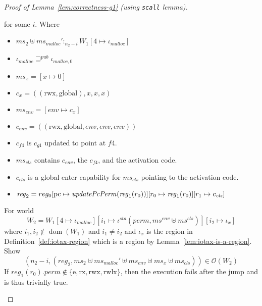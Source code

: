 \documentclass[a4paper]{article}
\newcommand{\update}[2]{[#1 \mapsto #2]}
\DeclareMathOperator{\dom}{dom}
\newcommand{\var}[1]{\mathit{#1}}
\newcommand{\hs}{\var{ms}}
\newcommand{\ms}{\hs}
\newcommand{\pcreg}{\mathrm{pc}}
\newcommand{\reg}{\var{reg}}
\newcommand{\heap}{\var{mem}}
\newcommand{\perm}{\var{perm}}
\newcommand{\sta}{\var{sta}}
\newcommand{\env}{\var{env}}
\newcommand{\cls}{\var{cls}}
\newcommand{\plainfun}[2]{
  \ifthenelse{\equal{#2}{}}
  {\mathit{#1}}
  {\mathit{#1}(#2)}
}
\newcommand{\updatePcPerm}[1]{\plainfun{updatePcPerm}{#1}}
\newcommand{\futurewk}{\mathbin{\sqsupseteq}^{\var{pub}}}
\newcommand{\heapSat}[3][\heap]{#1 :_{#2} #3}
\newcommand{\memSat}[3][n]{\heapSat[#2]{#1}{#3}}
\newcommand{\codelabel}[1]{\mathit{#1}}
\newcommand{\malloc}{\codelabel{malloc}}
\newcommand{\observations}{\mathcal{O}}
\newcommand{\npair}[2][n]{\left(#1,#2 \right)}
\newcommand{\plainperm}[1]{\mathrm{#1}}
\newcommand{\exec}{\plainperm{rx}}
\newcommand{\entry}{\plainperm{e}}
\newcommand{\rwx}{\plainperm{rwx}}
\newcommand{\rwlx}{\plainperm{rwlx}}
\newcommand{\glob}{\plainperm{global}}
\begin{document}
\begin{proof}[Proof of Lemma~\ref{lem:correctness-g1} (using \texttt{scall} lemma)]
\begin{enumproof}[resume]
\begin{enumproof}
\[          \]
          for some $i$. Where
          \begin{itemize}
          \item $\memSat[n_2-i]{\ms_2 \uplus \ms_\malloc'}{W_1\update{4}{\iota_\malloc}} $
          \item $\iota_\malloc \futurewk \iota_{\malloc,0}$
          \item $\ms_x = [x \mapsto 0]$
          \item $c_x = ((\rwx,\glob),x,x,x)$
          \item $\ms_\env = [\env \mapsto c_x]$
          \item $c_\env = ((\rwx,\glob,\env,\env,\env))$
          \item $c_{f4}$ is $c_{g1}$ updated to point at $f4$.
          \item $\ms_\cls$ contains $c_\env$, the $c_{f4}$, and the activation code.
          \item $c_\cls$ is a global enter capability for $\ms_\cls$ pointing to the activation code.
          \item $\reg_2 = reg_0\update{\pcreg}{\updatePcPerm{\reg_1(r_0)}}\update{r_0}{\reg_1(r_0)}\update{r_1}{c_\cls}$
          \end{itemize}
          For world
          \[
            W_2 = W_1\update{4}{\iota_\malloc}\update{i_1}{\iota^\sta (\perm,\ms^\env \uplus \ms^\cls)}\update{i_2}{\iota_x}
          \]
          where $i_1,i_2\not\in\dom(W_1)$ and $i_1 \neq i_2$ and $\iota_x$ is the region in Definition~\ref{def:iotax-region} which is a region by Lemma~\ref{lem:iotax-is-a-region}.
          Show
          \begin{equation}
            \label{eq:g1-obs-to-show}
            \npair[n_2-i]{(\reg_2,\ms_2 \uplus \ms_\malloc' \uplus \ms_\env \uplus \ms_x \uplus \ms_\cls)} \in \observations(W_2)
          \end{equation}
          If $\reg_1(r_0).\perm \not\in \{\entry, \exec, \rwx, \rwlx\}$, then the execution fails after the jump and \label{eq:g1-obs-to-show} is thus trivially true.


\end{enumproof}
\end{enumproof}
\end{proof}
\end{document}
